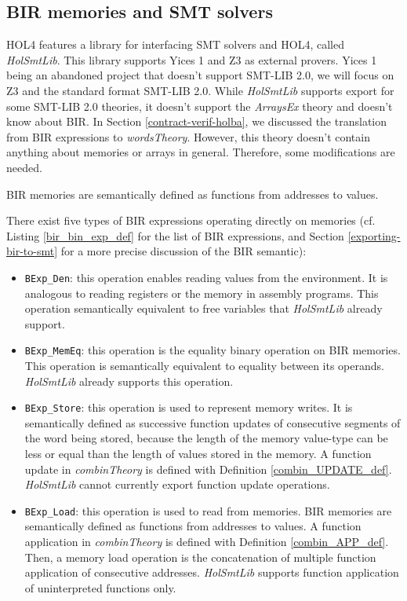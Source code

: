\documentclass{kththesis}
\begin{document}
\subsection{BIR memories and SMT solvers} \label{bir-memories-with-smt-solvers}


HOL4 features a library for interfacing \gls{SMT} solvers and HOL4, called \textit{HolSmtLib}. This library supports Yices 1 and Z3 as external provers. Yices 1 being an abandoned project that doesn't support SMT-LIB 2.0, we will focus on Z3 and the standard format SMT-LIB 2.0. While \textit{HolSmtLib} supports export for some SMT-LIB 2.0 theories, it doesn't support the \textit{ArraysEx} theory and doesn't know about BIR. In Section \ref{contract-verif-holba}, we discussed the translation from BIR expressions to \textit{wordsTheory}. However, this theory doesn't contain anything about memories or arrays in general. Therefore, some modifications are needed.


BIR memories are semantically defined as functions from addresses to values. 

There exist five types of BIR expressions operating directly on memories (cf. Listing \ref{bir_bin_exp_def} for the list of BIR expressions, and Section \ref{exporting-bir-to-smt} for a more precise discussion of the BIR semantic):

\begin{itemize}
    \item \texttt{BExp\_Den}: this operation enables reading values from the environment. It is analogous to reading registers or the memory in assembly programs. This operation semantically equivalent to free variables that \textit{HolSmtLib} already support.
    \item \texttt{BExp\_MemEq}: this operation is the equality binary operation on BIR memories. This operation is semantically equivalent to equality between its operands. \textit{HolSmtLib} already supports this operation.
    \item \texttt{BExp\_Store}: this operation is used to represent memory writes. It is semantically defined as successive function updates of consecutive segments of the word being stored, because the length of the memory value-type can be less or equal than the length of values stored in the memory. A function update in \textit{combinTheory} is defined with Definition \ref{combin_UPDATE_def}. \textit{HolSmtLib} cannot currently export function update operations.
    \item \texttt{BExp\_Load}: this operation is used to read from memories. BIR memories are semantically defined as functions from addresses to values. A function application in \textit{combinTheory} is defined with Definition \ref{combin_APP_def}. Then, a memory load operation is the concatenation of multiple function application of consecutive addresses. \textit{HolSmtLib} supports function application of uninterpreted functions only.
\end{itemize}
\end{document}
